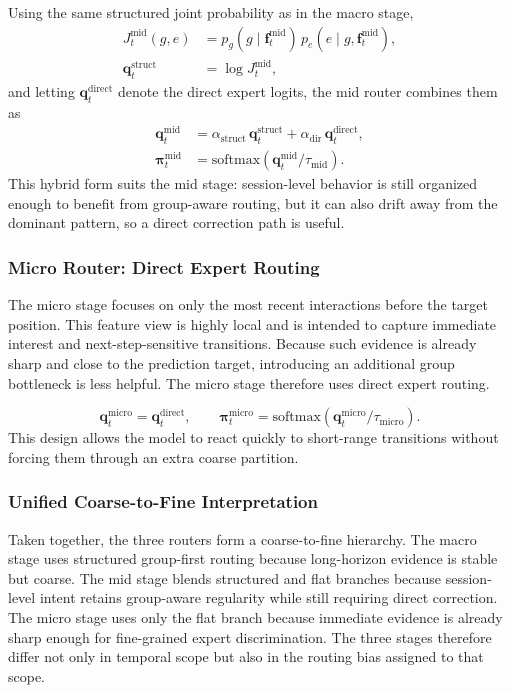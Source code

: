\documentclass[sigconf,anonymous,review]{acmart}
\begin{document}
Using the same structured joint probability as in the macro stage,
\begin{align}
J_t^{\mathrm{mid}}(g,e)
&= p_g(g \mid \mathbf{f}^{\mathrm{mid}}_t)\,p_e(e \mid g, \mathbf{f}^{\mathrm{mid}}_t), \\
\mathbf{q}^{\mathrm{struct}}_t
&= \log J_t^{\mathrm{mid}},
\end{align}
and letting $\mathbf{q}^{\mathrm{direct}}_t$ denote the direct expert logits, the mid router combines them as
\begin{align}
\mathbf{q}^{\mathrm{mid}}_t
&=
\alpha_{\mathrm{struct}}\,\mathbf{q}^{\mathrm{struct}}_t
+
\alpha_{\mathrm{dir}}\,\mathbf{q}^{\mathrm{direct}}_t, \\
\boldsymbol{\pi}^{\mathrm{mid}}_t
&=
\mathrm{softmax}\!\left(\mathbf{q}^{\mathrm{mid}}_t / \tau_{\mathrm{mid}}\right).
\end{align}
This hybrid form suits the mid stage: session-level behavior is still organized enough to benefit from group-aware routing, but it can also drift away from the dominant pattern, so a direct correction path is useful.

\subsubsection{Micro Router: Direct Expert Routing}

The micro stage focuses on only the most recent interactions before the target position. This feature view is highly local and is intended to capture immediate interest and next-step-sensitive transitions. Because such evidence is already sharp and close to the prediction target, introducing an additional group bottleneck is less helpful. The micro stage therefore uses direct expert routing.

\[
\mathbf{q}^{\mathrm{micro}}_t
=
\mathbf{q}^{\mathrm{direct}}_t,
\qquad
\boldsymbol{\pi}^{\mathrm{micro}}_t
=
\mathrm{softmax}\!\left(\mathbf{q}^{\mathrm{micro}}_t/\tau_{\mathrm{micro}}\right).
\]
This design allows the model to react quickly to short-range transitions without forcing them through an extra coarse partition.

\subsubsection{Unified Coarse-to-Fine Interpretation}

Taken together, the three routers form a coarse-to-fine hierarchy. The macro stage uses structured group-first routing because long-horizon evidence is stable but coarse. The mid stage blends structured and flat branches because session-level intent retains group-aware regularity while still requiring direct correction. The micro stage uses only the flat branch because immediate evidence is already sharp enough for fine-grained expert discrimination. The three stages therefore differ not only in temporal scope but also in the routing bias assigned to that scope.
\end{document}
